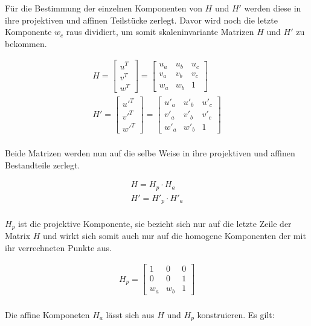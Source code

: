 Für die Bestimmung der einzelnen Komponenten von $H$ und $H'$ werden diese in ihre projektiven und affinen Teilstücke zerlegt. Davor wird noch die letzte Komponente $w_c$ raus dividiert, um somit  skaleninvariante Matrizen $H$ und $H'$ zu bekommen. 

\begin{gather}
H = \begin{bmatrix}
u^T\\v^T\\w^T
\end{bmatrix} =
\begin{bmatrix}
u_a&u_b&u_c\\
v_a&v_b&v_c\\
w_a&w_b&1
\end{bmatrix}\\
H' = \begin{bmatrix}
u'^T\\v'^T\\w'^T
\end{bmatrix} =
\begin{bmatrix}
u'_a&u'_b&u'_c\\
v'_a&v'_b&v'_c\\
w'_a&w'_b&1
\end{bmatrix}	
\end{gather}\\

Beide Matrizen werden nun auf die selbe Weise in ihre projektiven und affinen Bestandteile zerlegt.

\begin{gather}
	H = H_p \cdot H_a\\
	H' = H'_p \cdot H'_a
\end{gather}\\

$H_p$ ist die projektive Komponente, sie bezieht sich nur auf die letzte Zeile der Matrix $H$ und wirkt sich somit auch nur auf die homogene Komponenten der mit ihr verrechneten Punkte aus. 

\begin{gather}
	H_p = 
	\begin{bmatrix}
		1&0&0\\
		0&0&1\\
		w_a&w_b&1
	\end{bmatrix}
\end{gather}\\

Die affine Komponeten $H_a$ lässt sich aus $H$ und $H_p$ konstruieren. Es gilt:

